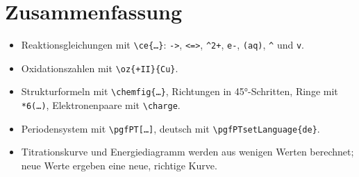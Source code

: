 \section{Zusammenfassung}

\begin{itemize}
	\item Reaktionsgleichungen mit \texttt{\textbackslash ce\{\dots\}}: \texttt{->}, \texttt{<=>}, \texttt{\^{}2+}, \texttt{e-}, \texttt{(aq)}, \texttt{\^{}} und \texttt{v}.
	\item Oxidationszahlen mit \texttt{\textbackslash oz\{+II\}\{Cu\}}.
	\item Strukturformeln mit \texttt{\textbackslash chemfig\{\dots\}}, Richtungen in 45°-Schritten, Ringe mit \texttt{*6(\dots)}, Elektronenpaare mit \texttt{\textbackslash charge}.
	\item Periodensystem mit \texttt{\textbackslash pgfPT[\dots]}, deutsch mit \texttt{\textbackslash pgfPTsetLanguage\{de\}}.
	\item Titrationskurve und Energiediagramm werden aus wenigen Werten berechnet; neue Werte ergeben eine neue, richtige Kurve.
\end{itemize}


